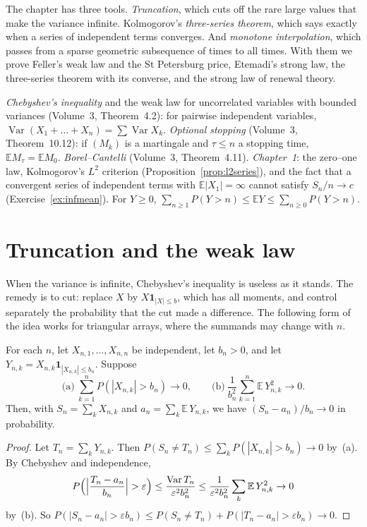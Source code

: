 The chapter has three tools. \emph{Truncation}, which cuts off the rare large values that make the variance infinite. Kolmogorov's
\emph{three-series theorem}, which says exactly when a series of independent terms converges. And \emph{monotone interpolation}, which
passes from a sparse geometric subsequence of times to all times. With them we prove Feller's weak law and the St Petersburg price,
Etemadi's strong law, the three-series theorem with its converse, and the strong law of renewal theory.

\begin{reminder}
\emph{Chebyshev's inequality} and the weak law for uncorrelated variables with bounded variances (Volume~3, Theorem~4.2): for pairwise independent
variables, $\operatorname{Var}(X_1+\dots+X_n)=\sum\operatorname{Var}X_k$. \emph{Optional stopping} (Volume~3, Theorem~10.12): if $(M_k)$ is a martingale and
$\tau\le n$ a stopping time, $\mathbb E M_\tau=\mathbb E M_0$. \emph{Borel--Cantelli} (Volume~3, Theorem~4.11). \emph{Chapter~1}: the zero--one law,
Kolmogorov's $L^2$ criterion (Proposition~\ref{prop:l2series}), and the fact that a convergent series of independent terms with
$\mathbb E|X_1|=\infty$ cannot satisfy $S_n/n\to c$ (Exercise~\ref{ex:infmean}). For $Y\ge0$, $\sum_{n\ge1}P(Y>n)\le\mathbb E Y\le\sum_{n\ge0}P(Y>n)$.
\end{reminder}

\section{Truncation and the weak law}

When the variance is infinite, Chebyshev's inequality is useless as it stands. The remedy is to cut: replace $X$ by $X\mathbf 1_{|X|\le b}$,
which has all moments, and control separately the probability that the cut made a difference. The following form of the idea works for
triangular arrays, where the summands may change with $n$.

\begin{theorem}\label{thm:wlltriangular}
For each $n$, let $X_{n,1},\dots,X_{n,n}$ be independent, let $b_n>0$, and let $Y_{n,k}=X_{n,k}\mathbf 1_{|X_{n,k}|\le b_n}$. Suppose
\[
\text{(a)}\ \sum_{k=1}^nP(|X_{n,k}|>b_n)\to0,\qquad\text{(b)}\ \frac1{b_n^2}\sum_{k=1}^n\mathbb E\,Y_{n,k}^2\to0.
\]
Then, with $S_n=\sum_kX_{n,k}$ and $a_n=\sum_k\mathbb E\,Y_{n,k}$, we have $(S_n-a_n)/b_n\to0$ in probability.
\end{theorem}
\begin{proof}
Let $T_n=\sum_kY_{n,k}$. Then $P(S_n\ne T_n)\le\sum_kP(|X_{n,k}|>b_n)\to0$ by~(a). By Chebyshev and independence,
\[
P\Bigl(\Bigl|\frac{T_n-a_n}{b_n}\Bigr|>\varepsilon\Bigr)\le\frac{\operatorname{Var}T_n}{\varepsilon^2b_n^2}\le\frac1{\varepsilon^2b_n^2}\sum_k\mathbb E\,Y_{n,k}^2\to0
\]
by~(b). So $P(|S_n-a_n|>\varepsilon b_n)\le P(S_n\ne T_n)+P(|T_n-a_n|>\varepsilon b_n)\to0$.
\end{proof}

